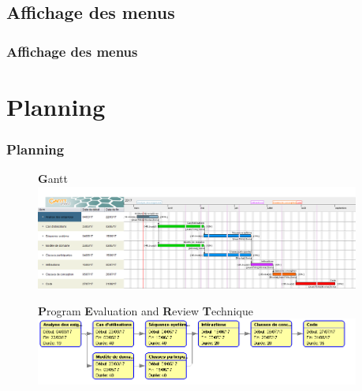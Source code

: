 \documentclass{beamer}
\begin{document}
\subsection{Affichage des menus}
\begin{frame}
\frametitle{Affichage des menus}

\end{frame}

\section{Planning}
\begin{frame}[label=planning]
\frametitle{Planning}
\begin{figure}[H]
\textbf{G}antt
\label{Gantt}
  \centering
      \includegraphics[width=0.95\textwidth]{Vitameal_gantt.png} %
\end{figure}

\begin{figure}[H]
\textbf{P}rogram \textbf{E}valuation and \textbf{R}eview \textbf{T}echnique
\label{PERT}
  \centering
      \includegraphics[width=0.95\textwidth]{Vitameal_pert.png} %
\end{figure}
\end{frame}
\end{document}
